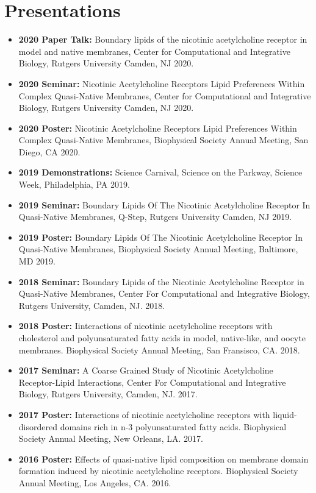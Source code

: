 \section*{Presentations}
\begin{itemize}
	\item \textbf{2020 Paper Talk:}  Boundary lipids of the nicotinic acetylcholine receptor in model and native membranes, Center for Computational and Integrative Biology, Rutgers University Camden, NJ 2020.
	\item \textbf{2020 Seminar:}  Nicotinic Acetylcholine Receptors Lipid Preferences Within Complex Quasi-Native Membranes, Center for Computational and Integrative Biology, Rutgers University Camden, NJ 2020.
	\item \textbf{2020 Poster:} Nicotinic Acetylcholine Receptors Lipid Preferences Within Complex Quasi-Native Membranes, Biophysical Society Annual Meeting, San Diego, CA 2020.
	\item \textbf{2019 Demonstrations:} Science Carnival, Science on the Parkway, Science Week, Philadelphia, PA 2019.
	\item \textbf{2019 Seminar:}  Boundary Lipids Of The Nicotinic Acetylcholine Receptor In Quasi-Native Membranes, Q-Step, Rutgers University Camden, NJ 2019.
	\item \textbf{2019 Poster:} Boundary Lipids Of The Nicotinic Acetylcholine Receptor In Quasi-Native Membranes, Biophysical Society Annual Meeting, Baltimore, MD 2019.
	\item \textbf{2018 Seminar:}  Boundary Lipids of the Nicotinic Acetylcholine Receptor in Quasi-Native Membranes, Center For Computational and Integrative Biology, Rutgers University, Camden, NJ. 2018.
	\item \textbf{2018 Poster:} I\MakeLowercase{INTERACTIONS OF NICOTINIC ACETYLCHOLINE RECEPTORS WITH CHOLESTEROL AND POLYUNSATURATED FATTY ACIDS IN MODEL, NATIVE-LIKE, AND OOCYTE MEMBRANES}. Biophysical Society Annual Meeting, San Fransisco, CA. 2018.
	\item \textbf{2017 Seminar:} A Coarse Grained Study of Nicotinic Acetylcholine Receptor-Lipid Interactions, Center For Computational and Integrative Biology, Rutgers University, Camden, NJ. 2017.
	\item \textbf{2017 Poster:} I\MakeLowercase{NTERACTIONS OF NICOTINIC ACETYLCHOLINE RECEPTORS WITH LIQUID-DISORDERED DOMAINS RICH IN n-3 POLYUNSATURATED FATTY ACIDS.} Biophysical Society Annual Meeting, New Orleans, LA. 2017.
	\item \textbf{2016 Poster:} E\MakeLowercase{FFECTS OF QUASI-NATIVE LIPID COMPOSITION ON MEMBRANE DOMAIN FORMATION INDUCED BY NICOTINIC ACETYLCHOLINE RECEPTORS.}  Biophysical Society Annual Meeting, Los Angeles, CA. 2016.
\end{itemize}
\vspace{4pt}
